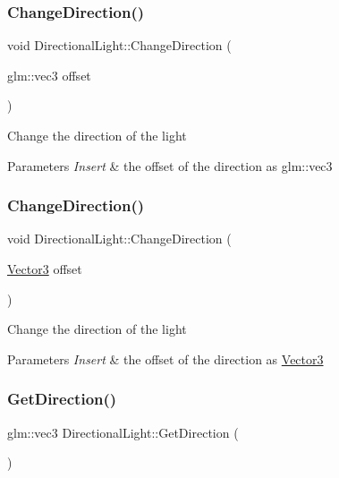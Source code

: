 \subsubsection{\texorpdfstring{ChangeDirection()}{ChangeDirection()}\hspace{0.1cm}{\footnotesize\ttfamily [1/2]}}
{\footnotesize\ttfamily void Directional\+Light\+::\+Change\+Direction (\begin{DoxyParamCaption}\item[{glm\+::vec3}]{offset }\end{DoxyParamCaption})}

Change the direction of the light 
\begin{DoxyParams}{Parameters}
{\em Insert} & the offset of the direction as glm\+::vec3 \\
\hline
\end{DoxyParams}
\mbox{\label{class_directional_light_a667b75a39de2416305a83b2778b928c0}} 
\subsubsection{\texorpdfstring{ChangeDirection()}{ChangeDirection()}\hspace{0.1cm}{\footnotesize\ttfamily [2/2]}}
{\footnotesize\ttfamily void Directional\+Light\+::\+Change\+Direction (\begin{DoxyParamCaption}\item[{\mbox{\hyperlink{struct_vector3}{Vector3}}}]{offset }\end{DoxyParamCaption})}

Change the direction of the light 
\begin{DoxyParams}{Parameters}
{\em Insert} & the offset of the direction as \mbox{\hyperlink{struct_vector3}{Vector3}} \\
\hline
\end{DoxyParams}
\mbox{\label{class_directional_light_ad3279d493f1c3748ac15d2797bb7016e}} 
\subsubsection{\texorpdfstring{GetDirection()}{GetDirection()}}
{\footnotesize\ttfamily glm\+::vec3 Directional\+Light\+::\+Get\+Direction (\begin{DoxyParamCaption}{ }\end{DoxyParamCaption})\hspace{0.3cm}{\ttfamily [inline]}}

